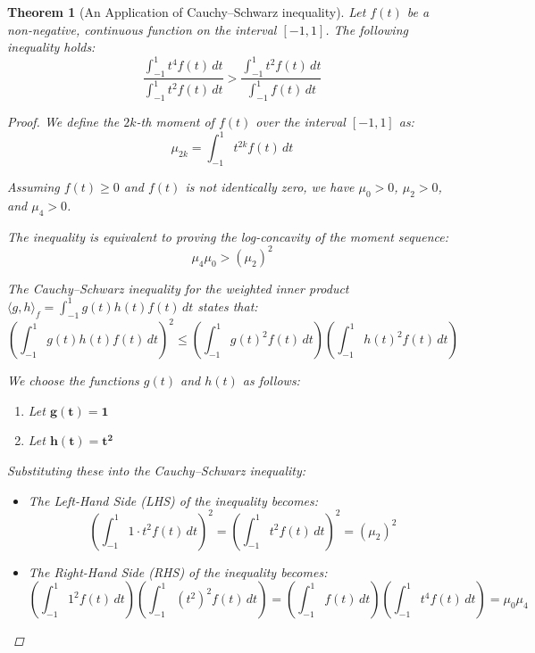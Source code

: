 \documentclass[11pt]{article}
\theoremstyle{breakdef}
\newtheorem{theorem}{Theorem}[section]
\begin{document}
\begin{theorem}[An Application of Cauchy--Schwarz inequality]\label{def:Cauchy}
Let $f(t)$ be a non-negative, continuous function on the interval $[-1, 1]$. The following inequality holds:
\begin{equation}
\frac{\int_{-1}^1 t^4 f(t) \, dt}{\int_{-1}^1 t^2 f(t) \, dt} > \frac{\int_{-1}^1 t^2 f(t) \, dt}{\int_{-1}^1 f(t) \, dt}
\end{equation}


\begin{proof}
We define the $2k$-th moment of $f(t)$ over the interval $[-1, 1]$ as:
\begin{equation}
\mu_{2k} = \int_{-1}^1 t^{2k} f(t) \, dt
\end{equation}

Assuming $f(t) \ge 0$ and $f(t)$ is not identically zero, we have $\mu_0 > 0$, $\mu_2 > 0$, and $\mu_4 > 0$.

The inequality is equivalent to proving the log-concavity of the moment sequence:
\begin{equation}
\mu_4 \mu_0 > (\mu_2)^2
\end{equation}

The Cauchy--Schwarz inequality for the weighted inner product $\langle g, h \rangle_f = \int_{-1}^1 g(t) h(t) f(t) \, dt$ states that:
\begin{equation}
\left( \int_{-1}^1 g(t) h(t) f(t) \, dt \right)^2 \le \left( \int_{-1}^1 g(t)^2 f(t) \, dt \right) \left( \int_{-1}^1 h(t)^2 f(t) \, dt \right)
\end{equation}

We choose the functions $g(t)$ and $h(t)$ as follows:
\begin{enumerate}
    \item Let $\mathbf{g(t) = 1}$
    \item Let $\mathbf{h(t) = t^2}$
\end{enumerate}

Substituting these into the Cauchy--Schwarz inequality:
\begin{itemize}
    \item The Left-Hand Side (LHS) of the inequality becomes:
\begin{equation}
    \left( \int_{-1}^1 1 \cdot t^2 f(t) \, dt \right)^2 = \left( \int_{-1}^1 t^2 f(t) \, dt \right)^2 = (\mu_2)^2
\end{equation}

    \item The Right-Hand Side (RHS) of the inequality becomes:
\begin{equation}
    \left( \int_{-1}^1 1^2 f(t) \, dt \right) \left( \int_{-1}^1 (t^2)^2 f(t) \, dt \right) = \left( \int_{-1}^1 f(t) \, dt \right) \left( \int_{-1}^1 t^4 f(t) \, dt \right) = \mu_0 \mu_4
\end{equation}


\end{itemize}
\end{proof}
\end{theorem}
\end{document}
